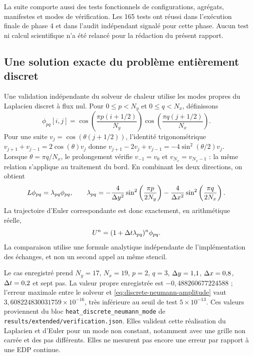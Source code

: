 La suite comporte aussi des tests fonctionnels de configurations,
agrégats, manifestes et modes de vérification. Les 165 tests ont
réussi dans l'exécution finale de phase 4 et dans l'audit indépendant
signalé pour cette phase. Aucun test ni calcul scientifique n'a été
relancé pour la rédaction du présent rapport.

\subsection{Une solution exacte du problème entièrement discret}

Une validation indépendante du solveur de chaleur utilise les modes
propres du Laplacien discret à flux nul. Pour
$0\leq p<N_y$ et $0\leq q<N_x$, définissons
\begin{equation}
 \phi_{pq}[i,j]=
 \cos\left(\frac{\pi p(i+1/2)}{N_y}\right)
 \cos\left(\frac{\pi q(j+1/2)}{N_x}\right).
 \label{eq:discrete-neumann-mode}
\end{equation}
Pour une suite $v_j=\cos(\theta(j+1/2))$, l'identité trigonométrique
$v_{j+1}+v_{j-1}=2\cos(\theta)v_j$ donne
$v_{j+1}-2v_j+v_{j-1}=-4\sin^2(\theta/2)v_j$.
Lorsque $\theta=\pi q/N_x$, le prolongement vérifie
$v_{-1}=v_0$ et $v_{N_x}=v_{N_x-1}$ : la même relation s'applique
au traitement du bord. En combinant les deux directions, on obtient
\begin{equation}
 L\phi_{pq}=\lambda_{pq}\phi_{pq},\qquad
 \lambda_{pq}=
 -\frac{4}{\Delta y^2}\sin^2\left(\frac{\pi p}{2N_y}\right)
 -\frac{4}{\Delta x^2}\sin^2\left(\frac{\pi q}{2N_x}\right).
 \label{eq:discrete-neumann-eigenvalue}
\end{equation}
La trajectoire d'Euler correspondante est donc exactement, en
arithmétique réelle,
\begin{equation}
 U^n=(1+\Delta t\lambda_{pq})^n\phi_{pq}.
 \label{eq:discrete-neumann-amplitude}
\end{equation}
La comparaison utilise une formule analytique indépendante de
l'implémentation des échanges, et non un second appel au même stencil.

Le cas enregistré prend $N_y=17$, $N_x=19$, $p=2$, $q=3$,
$\Delta y=1{,}1$, $\Delta x=0{,}8$, $\Delta t=0{,}2$ et sept pas.
La valeur propre enregistrée est $-0{,}488260677224588$ ; l'erreur
maximale entre le solveur et \eqref{eq:discrete-neumann-amplitude}
vaut $3{,}608224830031759\times10^{-16}$, très inférieure au seuil
de test $5\times10^{-13}$. Ces valeurs proviennent du bloc
\texttt{heat\_discrete\_neumann\_mode} de
\texttt{results/extended/verification.json}. Elles valident cette
réalisation du Laplacien et d'Euler pour un mode non constant,
notamment avec une grille non carrée et des pas différents.
Elles ne mesurent pas encore une erreur par rapport à une EDP continue.

